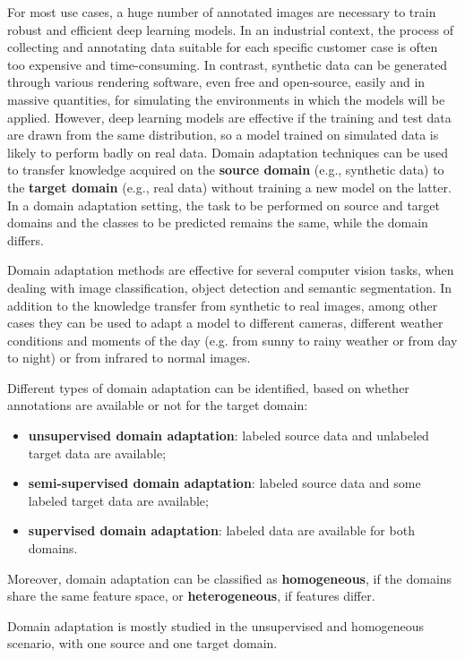 \documentclass[%
    corpo=12pt,
    twoside,
    stile=classica,   
    tipotesi=magistrale,
    evenboxes,
    english,
	numerazioneromana,
]{toptesi}
\begin{document}
For most use cases, a huge number of annotated images are necessary to train robust and efficient deep learning models. In an industrial context, the process of collecting and annotating data suitable for each specific customer case is often too expensive and time-consuming. In contrast, synthetic data can be generated through various rendering software, even free and open-source, easily and in massive quantities, for simulating the environments in which the models will be applied. However, deep learning models are effective if the training and test data are drawn from the same distribution, so a model trained on simulated data is likely to perform badly on real data. Domain adaptation techniques can be used to transfer knowledge acquired on the \textbf{source domain} (e.g., synthetic data) to the \textbf{target domain} (e.g., real data) without training a new model on the latter. In a domain adaptation setting, the task to be performed on source and target domains and the classes to be predicted remains the same, while the domain differs.

Domain adaptation methods are effective for several computer vision tasks, when dealing with image classification, object detection and semantic segmentation. In addition to the knowledge transfer from synthetic to real images, among other cases they can be used to adapt a model to different cameras, different weather conditions and moments of the day (e.g. from sunny to rainy weather or from day to night) or from infrared to normal images.

Different types of domain adaptation can be identified, based on whether annotations are available or not for the target domain:

\begin{itemize}
	\item \textbf{unsupervised domain adaptation}: labeled source data and unlabeled target data are available;
	\item \textbf{semi-supervised domain adaptation}: labeled source data and some labeled target data are available;
	\item \textbf{supervised domain adaptation}: labeled data are available for both domains.
\end{itemize}
Moreover, domain adaptation can be classified as \textbf{homogeneous}, if the domains share the same feature space, or \textbf{heterogeneous}, if features differ.

Domain adaptation is mostly studied in the unsupervised and homogeneous scenario, with one source and one target domain.
\end{document}

